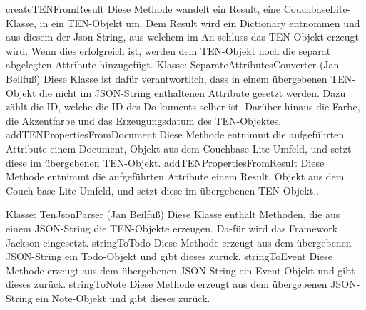 createTENFromResult
Diese Methode wandelt ein Result, eine CouchbaseLite-Klasse, in ein TEN-Objekt um. Dem Result wird ein Dictionary entnommen und aus diesem der Json-String, aus welchem im An-schluss das TEN-Objekt erzeugt wird. Wenn dies erfolgreich ist, werden dem TEN-Objekt noch die separat abgelegten Attribute hinzugefügt.
Klasse: SeparateAttributesConverter (Jan Beilfuß)
Diese Klasse ist dafür verantwortlich, dass in einem übergebenen TEN-Objekt die nicht im JSON-String enthaltenen Attribute gesetzt werden. Dazu zählt die ID, welche die ID des Do-kuments selber ist. Darüber hinaus die Farbe, die Akzentfarbe und das Erzeugungsdatum des TEN-Objektes.
addTENPropertiesFromDocument
Diese Methode entnimmt die aufgeführten Attribute einem Document, Objekt aus dem Couchbase Lite-Umfeld, und setzt diese im übergebenen TEN-Objekt.
addTENPropertiesFromResult
Diese Methode entnimmt die aufgeführten Attribute einem Result, Objekt aus dem Couch-base Lite-Umfeld, und setzt diese im übergebenen TEN-Objekt..

Klasse: TenJsonParser (Jan Beilfuß)
Diese Klasse enthält Methoden, die aus einem JSON-String die TEN-Objekte erzeugen. Da-für wird das Framework Jackson eingesetzt.
stringToTodo
Diese Methode erzeugt aus dem übergebenen JSON-String ein Todo-Objekt und gibt dieses zurück.
stringToEvent
Diese Methode erzeugt aus dem übergebenen JSON-String ein Event-Objekt und gibt dieses zurück.
stringToNote
Diese Methode erzeugt aus dem übergebenen JSON-String ein Note-Objekt und gibt dieses zurück.

